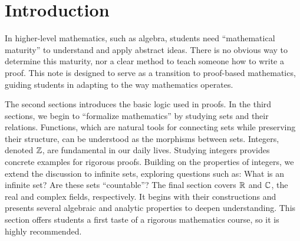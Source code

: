 \documentclass[10pt]{article}
\begin{document}
\def\htitle{An Introduction to Proofs}
\def\hauthor{Hassium}
\hsetup
\htoc
\hmain
\section{Introduction}
In higher-level mathematics, such as algebra, students need ``mathematical maturity'' to understand and apply abstract ideas. There is no obvious way to determine this maturity, nor a clear method to teach someone how to write a proof. This note is designed to serve as a transition to proof-based mathematics, guiding students in adapting to the way mathematics operates.
\par
The second sections introduces the basic logic used in proofs. In the third sections, we begin to “formalize mathematics” by studying sets and their relations. Functions, which are natural tools for connecting sets while preserving their structure, can be understood as the morphisms between sets. Integers, denoted $\mathbb{Z}$, are fundamental in our daily lives. Studying integers provides concrete examples for rigorous proofs. Building on the properties of integers, we extend the discussion to infinite sets, exploring questions such as: What is an infinite set? Are these sets “countable”? The final section covers $\mathbb{R}$ and $\mathbb{C}$, the real and complex fields, respectively. It begins with their constructions and presents several algebraic and analytic properties to deepen understanding. This section offers students a first taste of a rigorous mathematics course, so it is highly recommended.
\end{document}
